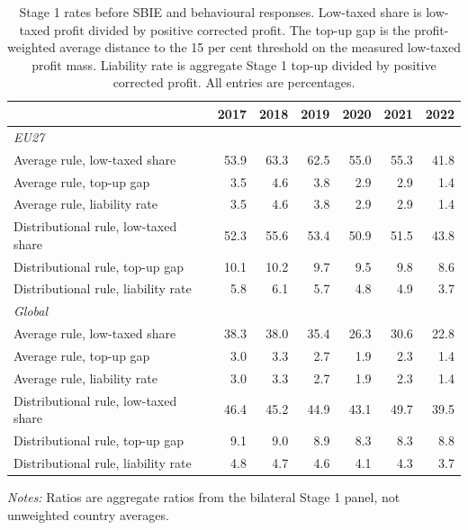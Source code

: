 \begin{table}[H]
\centering
\small
\caption[Stage 1 rates, EU27 and global]{Stage 1 rates before SBIE and behavioural responses. Low-taxed share is low-taxed profit divided by positive corrected profit. The top-up gap is the profit-weighted average distance to the 15 per cent threshold on the measured low-taxed profit mass. Liability rate is aggregate Stage 1 top-up divided by positive corrected profit. All entries are percentages.}
\label{tab:stage1_rates_updated}
\begin{tabular}{@{}lrrrrrr@{}}
\toprule
 & 2017 & 2018 & 2019 & 2020 & 2021 & 2022 \\
\midrule
\multicolumn{7}{l}{\textit{EU27}} \\
Average rule, low-taxed share & 53.9 & 63.3 & 62.5 & 55.0 & 55.3 & 41.8 \\
Average rule, top-up gap & 3.5 & 4.6 & 3.8 & 2.9 & 2.9 & 1.4 \\
Average rule, liability rate & 3.5 & 4.6 & 3.8 & 2.9 & 2.9 & 1.4 \\
Distributional rule, low-taxed share & 52.3 & 55.6 & 53.4 & 50.9 & 51.5 & 43.8 \\
Distributional rule, top-up gap & 10.1 & 10.2 &  9.7 &  9.5 &  9.8 &  8.6 \\
Distributional rule, liability rate & 5.8 & 6.1 & 5.7 & 4.8 & 4.9 & 3.7 \\
\multicolumn{7}{l}{\textit{Global}} \\
Average rule, low-taxed share & 38.3 & 38.0 & 35.4 & 26.3 & 30.6 & 22.8 \\
Average rule, top-up gap & 3.0 & 3.3 & 2.7 & 1.9 & 2.3 & 1.4 \\
Average rule, liability rate & 3.0 & 3.3 & 2.7 & 1.9 & 2.3 & 1.4 \\
Distributional rule, low-taxed share & 46.4 & 45.2 & 44.9 & 43.1 & 49.7 & 39.5 \\
Distributional rule, top-up gap & 9.1 & 9.0 & 8.9 & 8.3 & 8.3 & 8.8 \\
Distributional rule, liability rate & 4.8 & 4.7 & 4.6 & 4.1 & 4.3 & 3.7 \\
\bottomrule
\end{tabular}

\vspace{0.5em}
\begin{minipage}{0.96\textwidth}
\footnotesize\raggedright \textit{Notes:} Ratios are aggregate ratios from the bilateral Stage 1 panel, not unweighted country averages.
\end{minipage}
\end{table}
